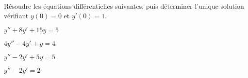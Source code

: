 \documentclass[a4paper, 11pt,reqno]{article}
\begin{document}
\begin{exercice}  \;
R\'esoudre les \'equations diff\'erentielles suivantes, puis d\'eterminer l'unique solution v\'erifiant $y(0)=0$ et $y'(0)=1$.
\begin{enumerate}
\begin{minipage}[t]{0.45\textwidth}
\item $y''+8y'+15y=5$
\item $4y''-4y'+y=4$
\end{minipage}
\noindent \begin{minipage}[t]{0.45\textwidth}
\item $y''-2y'+5y=5$
\item $y''-2y'=2$
\end{minipage}
\end{enumerate}
\end{exercice}
\end{document}
